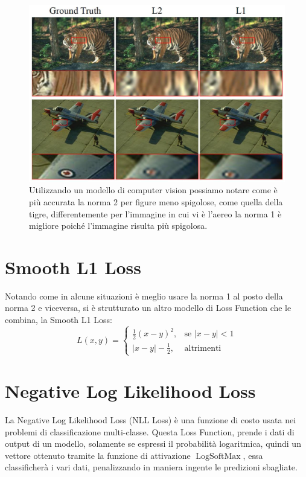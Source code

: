 \begin{figure}
    \centering
    \includegraphics[width=0.75\linewidth]{figure/L1andL2.png}
    \caption{Utilizzando un modello di computer vision possiamo notare come è più accurata la norma 2 per figure meno spigolose, come quella della tigre, differentemente per l'immagine in cui vi è l'aereo la norma 1 è migliore poiché l'immagine risulta più spigolosa.}
    \label{fig:l1l2diff}
\end{figure}

\section{Smooth L1 Loss}
Notando come in alcune situazioni è meglio usare la norma 1 al posto della norma 2 e viceversa, si è strutturato un altro modello di Loss Function che le combina, la Smooth L1 Loss:
\begin{equation}
L(x, y) = \begin{cases} 
\frac{1}{2} (x - y)^2, & \text{se } |x - y| < 1 \\
|x - y| - \frac{1}{2}, & \text{altrimenti}
\end{cases}
\end{equation}

\section{Negative Log Likelihood Loss}
La Negative Log Likelihood Loss (NLL Loss) è una funzione di costo usata nei problemi di classificazione multi-classe. Questa Loss Function, prende i dati di output di un modello, solamente se espressi il probabilità logaritmica, quindi un vettore ottenuto tramite la funzione di attivazione $\operatorname{LogSoftMax}$, essa classificherà i vari dati, penalizzando in maniera ingente le predizioni sbagliate.

